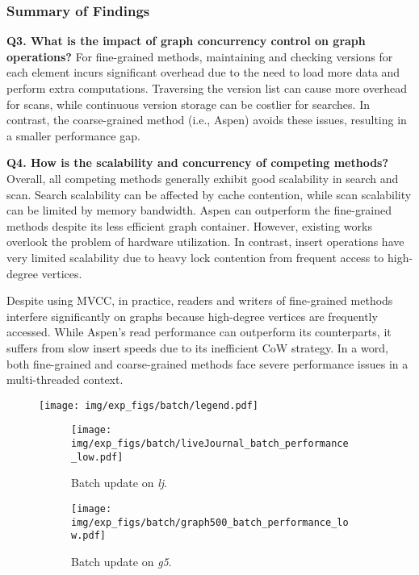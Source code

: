 \subsubsection{Summary of Findings} \textbf{Q3. What is the impact of graph concurrency control on graph operations?} For fine-grained methods, maintaining and checking versions for each element incurs significant overhead due to the need to load more data and perform extra computations. Traversing the version list can cause more overhead for scans, while continuous version storage can be costlier for searches. In contrast, the coarse-grained method (i.e., Aspen) avoids these issues, resulting in a smaller performance gap.



\vspace{2pt}
\noindent\textbf{Q4. How is the scalability and concurrency of competing methods?} Overall, all competing methods generally exhibit good scalability in search and scan. Search scalability can be affected by cache contention, while scan scalability can be limited by memory bandwidth. Aspen can outperform the fine-grained methods despite its less efficient graph container. However, existing works overlook the problem of hardware utilization. In contrast, insert operations have very limited scalability due to heavy lock contention from frequent access to high-degree vertices.


Despite using MVCC, in practice, readers and writers of fine-grained methods interfere significantly on graphs because high-degree vertices are frequently accessed. While Aspen’s read performance can outperform its counterparts, it suffers from slow insert speeds due to its inefficient CoW strategy. In a word, both fine-grained and coarse-grained methods face severe performance issues in a multi-threaded context.

\begin{figure}[t]
    \setlength{\abovecaptionskip}{0pt}
    \setlength{\belowcaptionskip}{0pt}
    \captionsetup[subfigure]{aboveskip=0pt,belowskip=0pt}
    \centering
    \texttt{[image: img/exp\_figs/batch/legend.pdf]}\\
    \begin{subfigure}[t]{0.30\textwidth}
        \centering
        \texttt{[image: img/exp\_figs/batch/liveJournal\_batch\_performance\_low.pdf]}
        \caption{Batch update on \emph{lj}.}
        \label{fig:batch_update_on_lj}
    \end{subfigure}
    \begin{subfigure}[t]{0.30\textwidth}
        \centering
        \texttt{[image: img/exp\_figs/batch/graph500\_batch\_performance\_low.pdf]}
        \caption{Batch update on \emph{g5}.}
        \label{figbatch_update_on_g5}
    \end{subfigure}
    
	\caption{}
	\label{fig:batch_update_throughput}
\end{figure}

